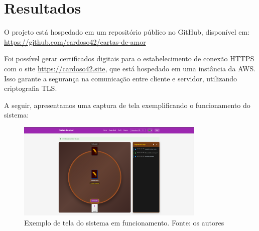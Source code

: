 \chapter{Resultados}

O projeto está hospedado em um repositório público no GitHub, disponível em: 
\url{https://github.com/cardoso42/cartas-de-amor}

Foi possível gerar certificados digitais para o estabelecimento de conexão HTTPS com o site \url{https://cardoso42.site}, que está hospedado em uma instância da AWS. Isso garante a segurança na comunicação entre cliente e servidor, utilizando criptografia TLS.

A seguir, apresentamos uma captura de tela exemplificando o funcionamento do sistema:

\begin{figure}[H]
    \centering
    \includegraphics[width=0.8\textwidth]{../screens/image.png}
    \caption{Exemplo de tela do sistema em funcionamento. Fonte: os autores}
    \label{fig:screen_example}
\end{figure}


